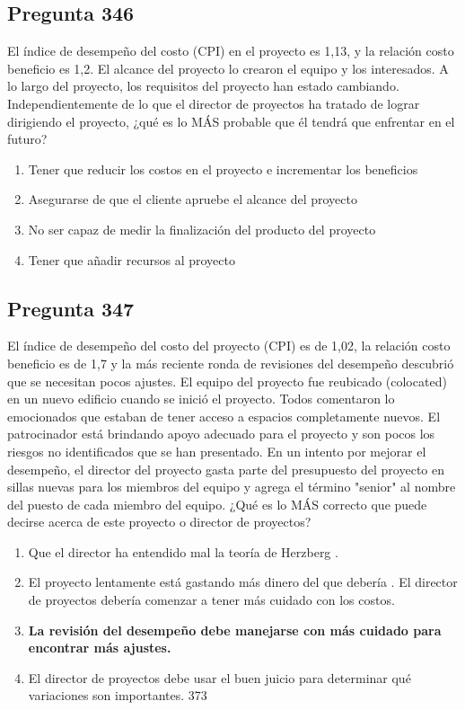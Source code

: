 \documentclass[11pt,a4paper]{article}
\begin{document}
\subsection*{Pregunta 346}
El índice de desempeño del costo (CPI) en el proyecto es 1,13, y la relación costo beneficio es 1,2. El alcance del proyecto lo crearon el equipo y los interesados. A lo largo del proyecto, los requisitos del proyecto han estado cambiando. Independientemente de lo que el director de proyectos ha tratado de lograr dirigiendo el proyecto, ¿qué es lo MÁS probable que él tendrá que enfrentar en el futuro?

\begin{enumerate}[label=\alph*)]
  \item Tener que reducir los costos en el proyecto e incrementar los beneficios
  \item Asegurarse de que el cliente apruebe el alcance del proyecto
  \item No ser capaz de medir la finalización del producto del proyecto
  \item Tener que añadir recursos al proyecto
\end{enumerate}

\subsection*{Pregunta 347}
El índice de desempeño del costo del proyecto (CPI) es de 1,02, la relación costo beneficio es de 1,7 y la más reciente ronda de revisiones del desempeño descubrió que se necesitan pocos ajustes. El equipo del proyecto fue reubicado (colocated) en un nuevo edificio cuando se inició el proyecto. Todos comentaron lo emocionados que estaban de tener acceso a espacios completamente nuevos. El patrocinador está brindando apoyo adecuado para el proyecto y son pocos los riesgos no identificados que se han presentado. En un intento por mejorar el desempeño, el director del proyecto gasta parte del presupuesto del proyecto en sillas nuevas para los miembros del equipo y agrega el término "senior" al nombre del puesto de cada miembro del equipo. ¿Qué es lo MÁS correcto que puede decirse acerca de este proyecto o director de proyectos?

\begin{enumerate}[label=\alph*)]
  \item Que el director ha entendido mal la teoría de Herzberg .
  \item El proyecto lentamente está gastando más dinero del que debería . El director de proyectos debería comenzar a tener más cuidado con los costos.
  \item \textbf{La revisión del desempeño debe manejarse con más cuidado para encontrar más ajustes.}
  \item El director de proyectos debe usar el buen juicio para determinar qué variaciones son importantes. 373
\end{enumerate}
\end{document}
